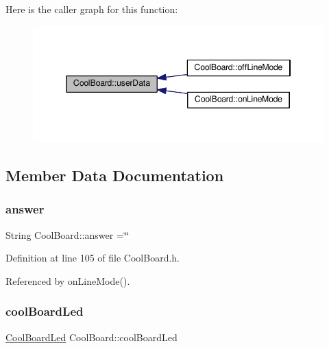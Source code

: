 Here is the caller graph for this function\+:
\nopagebreak
\begin{figure}[H]
\begin{center}
\leavevmode
\includegraphics[width=346pt]{classCoolBoard_ae7358fb6e623cfc81b775f5f1734909b_icgraph}
\end{center}
\end{figure}


\subsection{Member Data Documentation}
\mbox{\label{classCoolBoard_a7b835fafd449e5282f7f91d787a2dc15}} 
\subsubsection{\texorpdfstring{answer}{answer}}
{\footnotesize\ttfamily String Cool\+Board\+::answer =\char`\"{}\char`\"{}\hspace{0.3cm}{\ttfamily [private]}}



Definition at line 105 of file Cool\+Board.\+h.



Referenced by on\+Line\+Mode().

\mbox{\label{classCoolBoard_a1b1d3c684a5baa56b08486e192fd8e97}} 
\subsubsection{\texorpdfstring{cool\+Board\+Led}{coolBoardLed}}
{\footnotesize\ttfamily \hyperlink{classCoolBoardLed}{Cool\+Board\+Led} Cool\+Board\+::cool\+Board\+Led\hspace{0.3cm}{\ttfamily [private]}}



